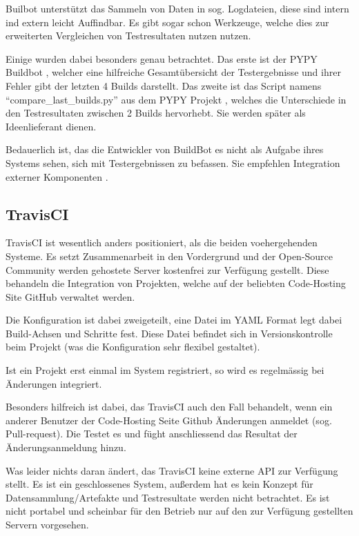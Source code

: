 Builbot unterst\"utzt das Sammeln von Daten in sog. Logdateien,
diese sind intern ind extern leicht Auffindbar.
Es gibt sogar schon Werkzeuge, welche dies zur erweiterten Vergleichen von Testresultaten nutzen nutzen.

Einige wurden dabei besonders genau betrachtet.
Das erste ist der PYPY Buildbot \cite{pypy:overview} , welcher eine hilfreiche Gesamtübersicht der Testergebnisse und ihrer Fehler gibt
der letzten 4 Builds darstellt.
Das zweite ist das Script namens ``compare\_last\_builds.py''
aus dem PYPY Projekt \cite{pypy:diffscript} ,
welches die Unterschiede in den Testresultaten zwischen 2 Builds hervorhebt.
Sie werden sp\"ater als Ideenlieferant dienen.

Bedauerlich ist, das die Entwickler von BuildBot es nicht als Aufgabe ihres Systems sehen,
sich mit Testergebnissen zu befassen.
Sie empfehlen Integration externer Komponenten \cite{buildbot:irc}.

\subsection{TravisCI}


TravisCI \cite{travisci:website} ist wesentlich anders positioniert, als die beiden voehergehenden Systeme.
Es setzt Zusammenarbeit in den Vordergrund und der Open-Source Community werden gehostete Server
kostenfrei zur Verf\"ugung gestellt.
Diese behandeln die Integration von Projekten,
welche auf der beliebten Code-Hosting Site GitHub verwaltet werden.

Die Konfiguration ist dabei zweigeteilt,
eine Datei im YAML Format \cite{yaml:website} legt dabei Build-Achsen und Schritte fest.
Diese Datei befindet sich in Versionskontrolle beim Projekt
(was die Konfiguration sehr flexibel gestaltet).

Ist ein Projekt erst einmal im System registriert,
so wird es regelm\"assig bei \"Anderungen integriert.

Besonders hilfreich ist dabei, das TravisCI auch den Fall behandelt,
wenn ein anderer Benutzer der Code-Hosting Seite Github \"Anderungen anmeldet
\cite{github:pullreq} (sog. Pull-request).
Die Testet es und f\"ught anschliessend das Resultat der \"Anderungsanmeldung hinzu.

Was leider nichts daran \"andert, das TravisCI keine externe API zur Verfügung stellt.
Es ist ein geschlossenes System, außerdem hat es kein Konzept f\"ur Datensammlung/Artefakte
und Testresultate werden nicht betrachtet.
Es ist nicht portabel und scheinbar f\"ur den Betrieb nur
auf den zur Verfügung gestellten Servern vorgesehen.


